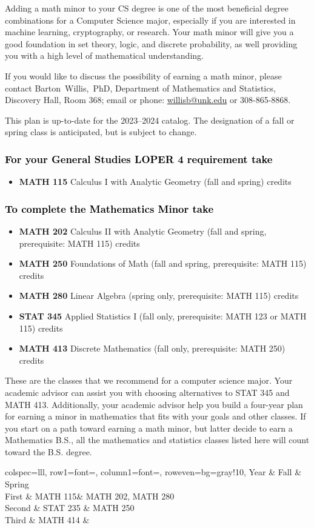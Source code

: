 \documentclass[10pt]{article}
\makeatletter
\newcommand{\calcone}{\textbf{MATH 115} Calculus I with Analytic Geometry (fall and spring) \dotfill 5 credits}
\newcommand{\calconeshort}{MATH 115}
\newcommand{\calctwo}{\textbf{MATH 202} Calculus II with Analytic Geometry (fall and spring, prerequisite: MATH 115) \dotfill 5 credits }
\newcommand{\calctwoshort}{MATH 202}
\newcommand{\foundations}{\textbf{MATH 250} Foundations of Math (fall and spring, prerequisite: MATH 115)  \dotfill 3 credits}
\newcommand{\linear}{\textbf{MATH 280} Linear Algebra (spring only, prerequisite: MATH 115) \dotfill 3 credits}
\newcommand{\linearshort}{MATH 280}
\newcommand{\discrete}{\textbf{MATH 413} Discrete Mathematics  (fall only, prerequisite: MATH 250)\dotfill 3 credits}
\newcommand{\discreteshort}{MATH 413}
\newcommand{\appliedstat}{\textbf{STAT 345} Applied Statistics I (fall only, prerequisite: MATH 123 or MATH 115) \dotfill 3 credits}
\newcommand{\appliedstatshort}{STAT 345}
\newcommand{\contactbw}{\mbox{Barton Willis, PhD}, Department of Mathematics and Statistics,  Discovery Hall, Room 368;
email or phone: \href{mailto:willisb@unk.edu}{willisb@unk.edu} or 308-865-8868.}
\newcommand{\forinfo}[2]{If you would like to discuss the possibility of earning a math {#1}, please contact \contactbw}
\newcommand{\catalog}{2023--2024 }
\newcommand{\LOPER}{LOPER\xspace}
\newcommand{\uptodate}{This plan is up-to-date for  the \catalog catalog. The designation of a fall or spring class is 
anticipated, but  is subject to change.}
\newcommand{\mathminor}{      
\begin{table}[h]
  \caption*{Suggested Math Minor program of study}
   \center
  \begin{tblr}{
      colspec={lll},
      row{1}={font=\bfseries},
      column{1}={font=\itshape},
      row{even}={bg=gray!10},
    }
     Year        & Fall  & Spring   \\
    \toprule
    First & \calconeshort  & \calctwoshort, \linearshort  \\
    Second & STAT 235 & MATH 250  \\
    Third & MATH 414 & \\
    \bottomrule
  \end{tblr}
\end{table}}
\makeatother
\begin{document}
Adding a math minor to your CS degree is one of the most beneficial degree combinations 
for a Computer Science major, especially if you are interested in machine learning, 
cryptography,  or research.  Your math minor will give you a good foundation in 
set theory, logic, and discrete probability, as well providing you with a high level of 
mathematical understanding. 

 
 \forinfo{minor}{Cyber Security Operations Comprehensive}

\uptodate
\vspace{-0.1in}

\subsubsection*{\textcolor{black}{For  your General Studies \LOPER 4 requirement take}}
\begin{itemize}
\item  \calcone
\end{itemize}

\subsubsection*{\textcolor{black}{To complete the Mathematics Minor take}}

\begin{itemize}
\item \calctwo
\item \foundations
\item \linear
\item \appliedstat
\item \discrete
\end{itemize}
\vspace{0.1in}
These are the classes that we recommend for a computer science major.
Your academic advisor can assist you with choosing alternatives 
to \appliedstatshort{} and \discreteshort{}. Additionally, your academic advisor help you build a four-year plan for earning 
a minor in mathematics that fits with your goals and other classes.  
If you start on a path toward earning a math minor, but latter decide to earn a  
Mathematics B.S., all the mathematics and statistics  
classes listed here will count toward the B.S. degree.
\mathminor
\end{document}
